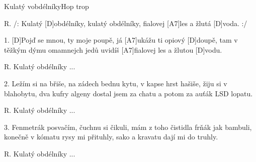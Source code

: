 \begin{song}{Kulatý vobdélníky}{Hop trop}

\begin{xverse}{R. }
/: Kulatý [D]obdélníky, kulatý obdélníky,
fialovej [A7]les a žlutá [D]voda. :/
\end{xverse}

\begin{xverse}{1. }
[D]Pojď se mnou, ty moje poupě,
já [A7]ukážu ti opiový [D]doupě,
tam v těžkým dýmu omamnejch jedů
uvidíš [A7]fialovej les a žlutou [D]vodu.
\end{xverse}

\begin{xverse}{R. }
Kulatý obdélníky ...
\end{xverse}

\begin{xverse}{2. }
Ležím si na břiše, na zádech bednu kytu,
v kapse hrst hašiše, žiju si v blahobytu,
dva kufry algeny dostal jsem za chatu
a potom za auťák LSD lopatu.
\end{xverse}

\begin{xverse}{R. }
Kulatý obdélníky ...
\end{xverse}

\begin{xverse}{3. }
Fenmetrák posvačím, čuchnu si čikuli,
mám z toho čistidla frňák jak bambuli,
konečně v kómatu rysy mi přituhly,
sako a kravatu dají mi do truhly.
\end{xverse}

\begin{xverse}{R. }
Kulatý obdélníky ...
\end{xverse}

\end{song}

